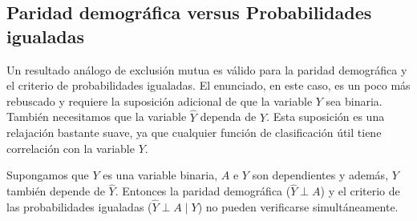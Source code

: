 \documentclass[oneside,openright,titlepage,numbers=noenddot,openany,headinclude,footinclude=true,
cleardoublepage=empty,abstractoff,BCOR=5mm,paper=a4,fontsize=12pt,main=spanish]{scrreprt}
\begin{document}
\subsection{Paridad demográfica versus Probabilidades igualadas}

Un resultado análogo de exclusión mutua es válido para la paridad demográfica y el criterio de probabilidades igualadas. El enunciado, en este caso, es un poco más rebuscado y requiere la suposición adicional de que la variable $Y$ sea binaria. También necesitamos que la variable $\hat{Y}$ dependa de $Y$. Esta suposición es una relajación bastante suave, ya que cualquier función de clasificación útil tiene correlación con la variable $Y$.\\

\begin{lemma} 
Supongamos que $Y$ es una variable binaria, $A$ e $Y$ son dependientes y además, $Y$  también depende de $\hat{Y}$. Entonces la paridad demográfica ($\hat{Y} \perp A$) y el criterio de las probabilidades igualadas ($\hat{Y} \perp A \mid Y$) no pueden verificarse simultáneamente.
\label{lem:demoigu}
\end{lemma}
\end{document}
